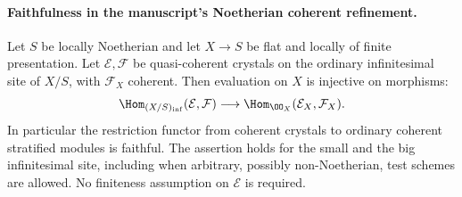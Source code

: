\paragraph{Faithfulness in the manuscript's Noetherian coherent refinement.}

\begin{proposition}\label{prop:DE-E2-coherent-faithfulness}
Let $S$ be locally Noetherian and let $X\to S$ be flat and locally of finite presentation.  Let $\mathcal E,\mathcal F$ be quasi-coherent crystals on the ordinary infinitesimal site of $X/S$, with $\mathcal F_X$ coherent.  Then evaluation on $X$ is injective on morphisms:
\[
 \Hom_{(X/S)_{\rm inf}}(\mathcal E,\mathcal F)
       \longrightarrow \Hom_{\OO_X}(\mathcal E_X,\mathcal F_X).
\]
In particular the restriction functor from coherent crystals to ordinary coherent stratified modules is faithful.  The assertion holds for the small and the big infinitesimal site, including when arbitrary, possibly non-Noetherian, test schemes are allowed.  No finiteness assumption on $\mathcal E$ is required.
\end{proposition}
